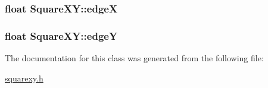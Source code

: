 \subsubsection[{\texorpdfstring{edgeX}{edgeX}}]{\setlength{\rightskip}{0pt plus 5cm}float Square\+X\+Y\+::edgeX\hspace{0.3cm}{\ttfamily [private]}}\hypertarget{classSquareXY_abf2008e382a25547045a77c15339d465}{}\label{classSquareXY_abf2008e382a25547045a77c15339d465}
\subsubsection[{\texorpdfstring{edgeY}{edgeY}}]{\setlength{\rightskip}{0pt plus 5cm}float Square\+X\+Y\+::edgeY\hspace{0.3cm}{\ttfamily [private]}}\hypertarget{classSquareXY_a6ebaa2b3dffa23795ea2e887b3e5e0c1}{}\label{classSquareXY_a6ebaa2b3dffa23795ea2e887b3e5e0c1}


The documentation for this class was generated from the following file\+:\begin{DoxyCompactItemize}
\item 
\hyperlink{squarexy_8h}{squarexy.\+h}\end{DoxyCompactItemize}
